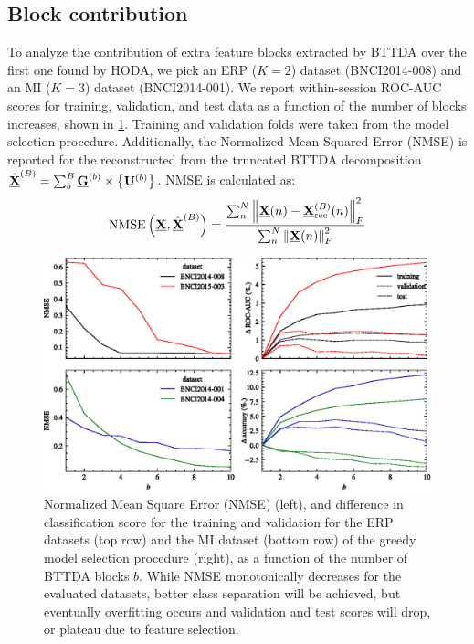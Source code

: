 \documentclass[10pt]{iopart}
\begin{document}
\subsection{Block contribution}
To analyze the contribution of extra feature blocks extracted by BTTDA over
the first one found by HODA, we pick an ERP ($K=2$) dataset
(BNCI2014-008) and an MI ($K=3$) dataset (BNCI2014-001).
We report within-session ROC-AUC scores for training, validation, and test data as a function
of the number of blocks increases, shown in \cref{fig:blocks}.
Training and validation folds were taken from the model selection procedure.
Additionally, the Normalized Mean Squared Error (NMSE) is reported for the
reconstructed from the truncated BTTDA decomposition
$\textstyle{\hat{\underline{\mathbf{X}}}^{(B)}=\sum_b^B\underline{\mathbf{G}}^{(b)}\times\left\{\mathbf{U}^{(b)}\right\}}$.
NMSE is calculated as:
\begin{equation}
  \mathop{\mathrm{NMSE}}\left(\underline{\mathbf{X}}, \hat{\underline{\mathbf{X}}}^{(B)}\right) =
	\frac{\sum_n^N\left\|\underline{\mathbf{X}}(n)-\underline{\mathbf{X}}_\text{rec}^{(B)}(n)\right\|_F^2}
	{\sum_n^N\left\|\underline{\mathbf{X}}(n)\right\|_F^2}
\end{equation}
\begin{figure}[t]
  \includegraphics[width=\linewidth]{figures/blocks.eps}
  \caption[Analysis of NMSE and classification score per block.]{%
    Normalized Mean Square Error (NMSE) (left), and difference in
    classification score for the training and validation for the ERP datasets
    (top row) and the MI dataset (bottom row)	of the greedy model selection
    procedure (right), as a function of the number of BTTDA blocks $b$.
		While NMSE monotonically decreases for the evaluated datasets, better class
		separation will be achieved, but eventually overfitting occurs and validation
		and test scores will drop, or plateau due to feature selection.
	}
	\label{fig:blocks}
\end{figure}
\end{document}
